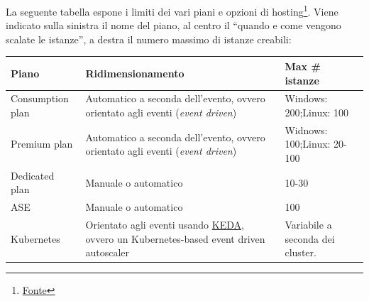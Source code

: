 \documentclass[a4paper]{article}
\newcommand{\dquotes}[1]{``#1''}
\begin{document}
	La seguente tabella espone i limiti dei vari piani e opzioni di hosting\footnote{\href{https://learn.microsoft.com/en-gb/azure/azure-functions/functions-scale}{Fonte}}. Viene indicato sulla sinistra il nome del piano, al centro il \dquotes{quando e come vengono scalate le istanze}, a destra il numero massimo di istanze creabili:
	\begin{table}[!htp]
		\centering
		\begin{tabular}{@{} l p{15em} p{9em} @{}}
			\toprule
			Piano & Ridimensionamento & Max \# istanze \\
			\midrule
			Consumption plan & Automatico a seconda dell'evento, ovvero orientato agli eventi (\emph{event driven}) & Windows: 200;\newline Linux: 100 \\ 
			Premium plan & Automatico a seconda dell'evento, ovvero orientato agli eventi (\emph{event driven}) & Widnows: 100;\newline Linux: 20-100 \\
			Dedicated plan & Manuale o automatico & 10-30 \\
			ASE & Manuale o automatico & 100 \\
			Kubernetes & Orientato agli eventi usando \href{https://keda.sh/}{KEDA}, ovvero un Kubernetes-based event driven autoscaler & Variabile a seconda dei cluster. \\
			\bottomrule
		\end{tabular}
	\end{table}
\end{document}

